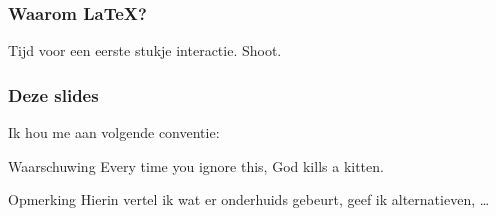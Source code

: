 \begin{frame}
  \frametitle{Waarom \LaTeX?}

  Tijd voor een eerste stukje interactie. Shoot.
\end{frame}


\begin{frame}
  \frametitle{Deze slides}
  Ik hou me aan volgende conventie:\pause
  \begin{alertblock}{Waarschuwing}
	  Every time you ignore this, God kills a kitten.
  \end{alertblock}
  
  \pause\begin{exampleblock}{Opmerking}
	  Hierin vertel ik wat er onderhuids gebeurt, geef ik alternatieven, \ldots
  \end{exampleblock}
\end{frame}
